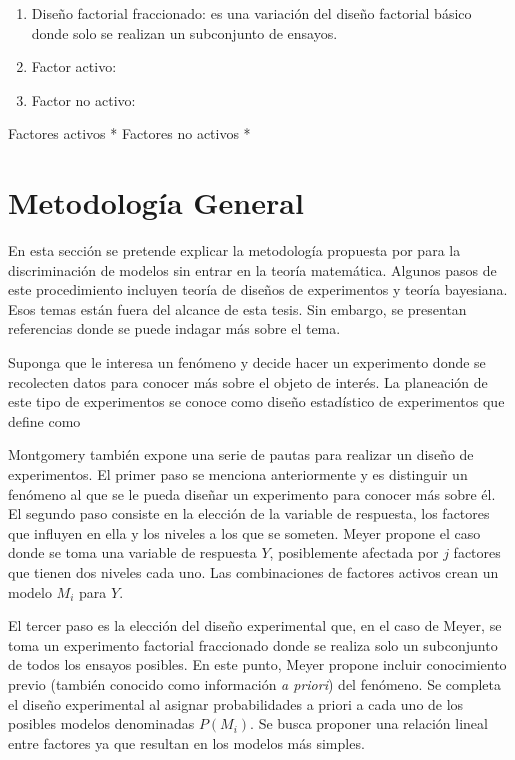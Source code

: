 \begin{enumerate}
	\item Diseño factorial fraccionado: es una variación del diseño factorial básico donde solo se realizan un subconjunto de ensayos. 
	
	
	\item Factor activo: 
	
	\item Factor no activo: 

	
\end{enumerate}


Factores activos *
Factores no activos *



\section{Metodología General} \label{sec_metodologia}

En esta sección se pretende explicar la metodología propuesta por \cite{meyer1996} para la discriminación de modelos sin entrar en la teoría matemática. Algunos pasos de este procedimiento incluyen teoría de diseños de experimentos y teoría bayesiana. Esos temas están fuera del alcance de esta tesis. Sin embargo, se presentan referencias donde se puede indagar más sobre el tema. 

Suponga que le interesa un fenómeno y decide hacer un experimento donde se recolecten datos para conocer más sobre el objeto de interés. La planeación de este tipo de experimentos se conoce como diseño estadístico de experimentos que \cite{montgomery2017design} define como 

Montgomery también expone una serie de pautas para realizar un diseño de experimentos. El primer paso se menciona anteriormente y es distinguir un fenómeno al que se le pueda diseñar un experimento para conocer más sobre él. El segundo paso consiste en la elección de la variable de respuesta, los factores que influyen en ella y los niveles a los que se someten. Meyer propone el caso donde se toma una variable de respuesta $Y$, posiblemente afectada por $j$ factores que tienen dos niveles cada uno. Las combinaciones de factores activos crean un modelo $M_i$ para $Y$.

El tercer paso es la elección del diseño experimental que, en el caso de Meyer, se toma un experimento factorial fraccionado donde se realiza solo un subconjunto de todos los ensayos posibles. En este punto, Meyer propone incluir conocimiento previo (también conocido como información \textit{a priori}) del fenómeno. Se completa el diseño experimental al asignar probabilidades a priori a cada uno de los posibles modelos denominadas $P(M_i)$. Se busca proponer una relación lineal entre factores ya que resultan en los modelos más simples. 


